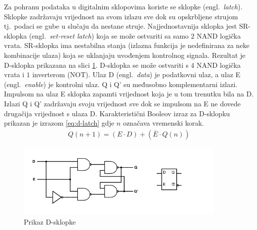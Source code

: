 \documentclass[times, utf8, diplomski]{fer}
\begin{document}
Za pohranu podataka u digitalnim sklopovima koriste se sklopke (engl.~\textit{latch}). Sklopke zadržavaju vrijednost na svom izlazu sve dok su opskrbljene strujom tj.~podaci se gube u slučaju da nestane struje. Najjednostavnija sklopka jest SR-sklopka (engl.~\textit{set-reset latch}) koja se može ostvariti sa samo $2$ NAND logička vrata. SR-sklopka ima nestabilna stanja (izlazna funkcija je nedefinirana za neke kombinacije ulaza) koja se uklanjaju uvođenjem kontrolnog signala. Rezultat je D-sklopka prikazana na slici \ref{fig:D-latch}. D-sklopka se može ostvariti s $4$ NAND logička vrata i $1$ inverterom (NOT). Ulaz D (engl.~\textit{data}) je podatkovni ulaz, a ulaz E (engl.~\textit{enable}) je kontrolni ulaz. Q i Q' su međusobno komplementarni izlazi. Impulsom na ulaz E sklopka zapamti vrijednost koja je u tom trenutku bila na D. Izlazi Q i Q' zadržavaju svoju vrijednost sve dok se impulsom na E ne dovede drugačija vrijednost s ulaza D. Karakteristični Booleov izraz za D-sklopku prikazan je izrazom \ref{eq:d-latch} gdje $n$ označava vremenski korak.
%
\begin{gather}
	\label{eq:d-latch}
	Q(n+1)=(E \cdot D) + (\overline{E} \cdot Q(n))
\end{gather}

\begin{figure}[htb]
	\centering
	\includegraphics[width=0.9\textwidth]{img/D-latch_full.png}
	\caption{Prikaz D-sklopke}
	\label{fig:D-latch}
\end{figure}

\end{document}
